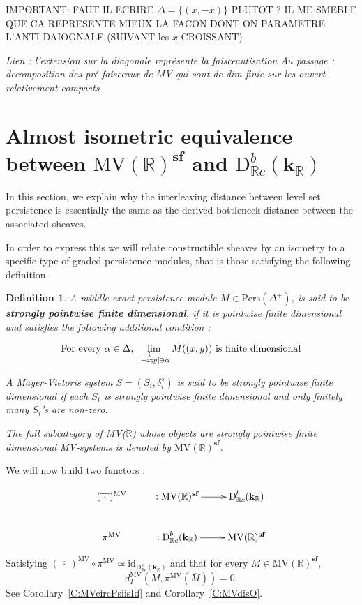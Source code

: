 \documentclass[a4paper, english, 11pt]{article}
\newcommand{\kk}[0]{\textbf{k}}
\newcommand{\0}{\vec{0}}
\newcommand{\R}[0]{\mathbb{R}}
\newcommand{\D}[0]{\text{D}}
\newcommand{\Pers}[0]{\text{Pers}}
\newcommand{\MV}{\text{MV}}
\newcommand{\s}{\textbf{sf}}
\newtheorem{defi}[prop]{Definition}
\begin{document}
IMPORTANT: FAUT IL ECRIRE $\Delta=\{ (x,-x)\}$ PLUTOT ? IL ME SMEBLE QUE CA REPRESENTE MIEUX LA FACON DONT ON PARAMETRE L'ANTI DAIOGNALE (SUIVANT les $x$ CROISSANT)

\emph{
Lien : l'extension sur la diagonale représente la faisceautisation
Au passage : decomposition des pré-faisceaux de MV qui sont de dim finie sur les ouvert relativement compacts
}


\section{ Almost isometric equivalence between $\mbox{MV}(\R)^\s$ and $\D^b_{\R c}(\kk_\R)$}
In this section, we explain why the interleaving distance between level set persistence is essentially the same as the derived bottleneck distance between the associated sheaves.

In order to express this we will relate constructible sheaves by an isometry to a specific type of graded persistence modules, that is those satisfying the following definition.
\begin{defi}\label{D:spfd}
 A middle-exact persistence module $M\in \Pers(\Delta^+)$, is said to be \textbf{strongly pointwise finite dimensional}, if it is pointwise finite dimensional and satisfies the following additional condition : 

$$\text{For every $\alpha \in \Delta$,}~ \varprojlim_{]-x;y[\ni \alpha}M((x,y))  ~ \text{is finite dimensional} $$

A  Mayer-Vietoris system $S=(S_i,\delta^s_i)$ is said to be strongly pointwise finite dimensional if each $S_i$ is strongly pointwise finite dimensional  and only finitely many  $S_i$'s are non-zero.

The full subcategory of MV($\R$) whose objects are strongly pointwise finite dimensional MV-systems is denoted by $\text{MV}(\R)^\s$.
\end{defi}



We will now  build two functors : 


$$\xymatrix{
(\overline{~\cdot~ })^{\text{MV}} & : \text{MV}(\R)^\s \ar[r] &\D^b_{\R c}(\kk_\R)  \\
\pi^{\text{MV}}  & : \D^b_{\R c}(\kk_\R) \ar[r] & \text{MV}(\R)^\s 
}$$

Satisfying $(\overline{~\cdot~ })^{\text{MV}} \circ \pi^{\text{MV}} \simeq \text{id}_{\D^b_{\R c}(\kk_\R)}$ and that for every $M\in \text{MV}(\R)^\s$, $$d_I^{\text{MV}}(M, \pi^\MV ( \overline{M})) = 0.$$
See Corollary~\ref{C:MVcircPsiisId} and Corollary~\ref{C:MVdisO}.
\end{document}

